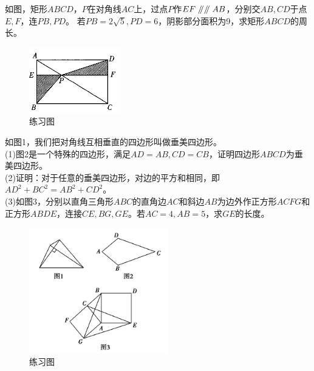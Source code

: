 \documentclass{ecnuthesis}
\newcommand\px{\mathrel{/\mkern-5mu/}}  %
\begin{document}
\begin{problem}
    如图，矩形$ABCD$，$P$在对角线$AC$上，过点$P$作$EF\px\px AB$，分别交$AB,CD$于点$E,F$，连$PB,PD$。
    若$PB=2\sqrt5,PD=6$，阴影部分面积为9，求矩形$ABCD$的周长。
\end{problem}
\begin{figure}[H]
\centering
\includegraphics[width=4cm]{picture/661.png}
\caption{练习图}
\end{figure}
\begin{problem}
    如图1，我们把对角线互相垂直的四边形叫做垂美四边形。 \\
    (1)图2是一个特殊的四边形，满足$AD=AB,CD=CB$，证明四边形$ABCD$为垂美四边形。\\
    (2)证明：对于任意的垂美四边形，对边的平方和相同，即$AD^2+BC^2=AB^2+CD^2$。 \\
    (3)如图3，分别以直角三角形$ABC$的直角边$AC$和斜边$AB$为边外作正方形$ACFG$和正方形$ABDE$，连接$CE,BG,GE$。若$AC=4,AB=5$，求$GE$的长度。
\end{problem}
\begin{figure}[H]
\centering
\includegraphics[width=6cm]{picture/666.png}
\caption{练习图}
\end{figure}
\clearpage
\end{document}
